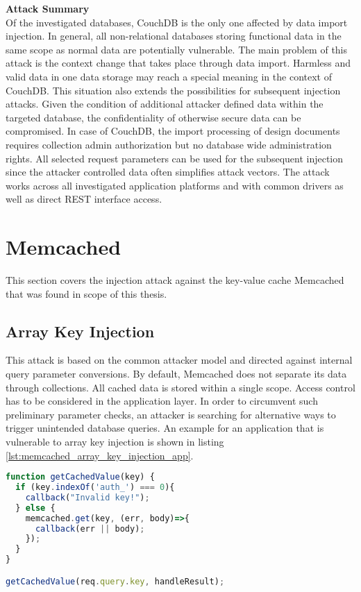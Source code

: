 \textbf{Attack Summary} \\
Of the investigated databases, CouchDB is the only one affected by data import injection. In general, all non-relational databases storing functional data in the same scope as normal data are potentially vulnerable. The main problem of this attack is the context change that takes place through data import. Harmless and valid data in one data storage may reach a special meaning in the context of CouchDB. This situation also extends the possibilities for subsequent injection attacks. Given the condition of additional attacker defined data within the targeted database, the confidentiality of otherwise secure data can be compromised. In case of CouchDB, the import processing of design documents requires collection admin authorization but no database wide administration rights. All selected request parameters can be used for the subsequent injection since the attacker controlled data often simplifies attack vectors. The attack works across all investigated application platforms and with common drivers as well as direct REST interface access. 

\section{Memcached}
This section covers the injection attack against the key-value cache Memcached that was found in scope of this thesis.
\subsection{Array Key Injection}
This attack is based on the common attacker model and directed against internal query parameter conversions. By default, Memcached does not separate its data through collections. All cached data is stored within a single scope. Access control has to be considered in the application layer. In order to circumvent such preliminary parameter checks, an attacker is searching for alternative ways to trigger unintended database queries. An example for an application that is vulnerable to array key injection is shown in listing \ref{lst:memcached_array_key_injection_app}.\\

\begin{lstlisting}[caption={Vulnerable NodeJS example for array key injection against Memcached}, label={lst:memcached_array_key_injection_app}, language=JavaScript]
function getCachedValue(key) {
  if (key.indexOf('auth_') === 0){
    callback("Invalid key!");
  } else {
    memcached.get(key, (err, body)=>{
      callback(err || body);
    });
  }
}

getCachedValue(req.query.key, handleResult);
\end{lstlisting}

